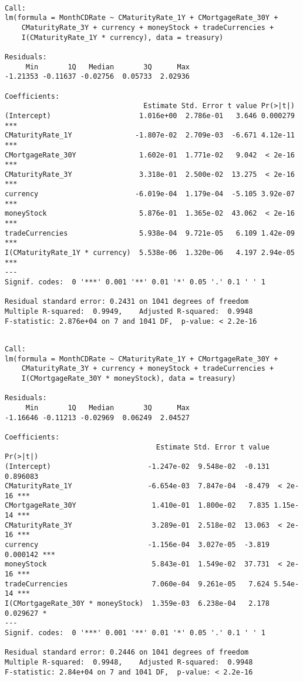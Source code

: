 \documentclass[11pt]{article}
\begin{document}
    
    \begin{verbatim}

Call:
lm(formula = MonthCDRate ~ CMaturityRate_1Y + CMortgageRate_30Y + 
    CMaturityRate_3Y + currency + moneyStock + tradeCurrencies + 
    I(CMaturityRate_1Y * currency), data = treasury)

Residuals:
     Min       1Q   Median       3Q      Max 
-1.21353 -0.11637 -0.02756  0.05733  2.02936 

Coefficients:
                                 Estimate Std. Error t value Pr(>|t|)    
(Intercept)                     1.016e+00  2.786e-01   3.646 0.000279 ***
CMaturityRate_1Y               -1.807e-02  2.709e-03  -6.671 4.12e-11 ***
CMortgageRate_30Y               1.602e-01  1.771e-02   9.042  < 2e-16 ***
CMaturityRate_3Y                3.318e-01  2.500e-02  13.275  < 2e-16 ***
currency                       -6.019e-04  1.179e-04  -5.105 3.92e-07 ***
moneyStock                      5.876e-01  1.365e-02  43.062  < 2e-16 ***
tradeCurrencies                 5.938e-04  9.721e-05   6.109 1.42e-09 ***
I(CMaturityRate_1Y * currency)  5.538e-06  1.320e-06   4.197 2.94e-05 ***
---
Signif. codes:  0 '***' 0.001 '**' 0.01 '*' 0.05 '.' 0.1 ' ' 1

Residual standard error: 0.2431 on 1041 degrees of freedom
Multiple R-squared:  0.9949,	Adjusted R-squared:  0.9948 
F-statistic: 2.876e+04 on 7 and 1041 DF,  p-value: < 2.2e-16

    \end{verbatim}

    
    
    \begin{verbatim}

Call:
lm(formula = MonthCDRate ~ CMaturityRate_1Y + CMortgageRate_30Y + 
    CMaturityRate_3Y + currency + moneyStock + tradeCurrencies + 
    I(CMortgageRate_30Y * moneyStock), data = treasury)

Residuals:
     Min       1Q   Median       3Q      Max 
-1.16646 -0.11213 -0.02969  0.06249  2.04527 

Coefficients:
                                    Estimate Std. Error t value Pr(>|t|)    
(Intercept)                       -1.247e-02  9.548e-02  -0.131 0.896083    
CMaturityRate_1Y                  -6.654e-03  7.847e-04  -8.479  < 2e-16 ***
CMortgageRate_30Y                  1.410e-01  1.800e-02   7.835 1.15e-14 ***
CMaturityRate_3Y                   3.289e-01  2.518e-02  13.063  < 2e-16 ***
currency                          -1.156e-04  3.027e-05  -3.819 0.000142 ***
moneyStock                         5.843e-01  1.549e-02  37.731  < 2e-16 ***
tradeCurrencies                    7.060e-04  9.261e-05   7.624 5.54e-14 ***
I(CMortgageRate_30Y * moneyStock)  1.359e-03  6.238e-04   2.178 0.029627 *  
---
Signif. codes:  0 '***' 0.001 '**' 0.01 '*' 0.05 '.' 0.1 ' ' 1

Residual standard error: 0.2446 on 1041 degrees of freedom
Multiple R-squared:  0.9948,	Adjusted R-squared:  0.9948 
F-statistic: 2.84e+04 on 7 and 1041 DF,  p-value: < 2.2e-16

    \end{verbatim}
\end{document}
